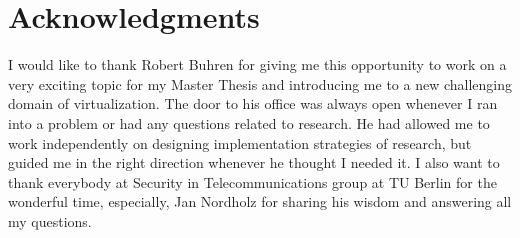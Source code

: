 \chapter*{Acknowledgments}

I would like to thank Robert Buhren for giving me this opportunity to work on a very exciting topic for my Master Thesis and introducing me to a new challenging domain of virtualization. The door to his office was always open whenever I ran into a problem or had any questions related to research. He had allowed me to work independently on designing implementation strategies of research, but guided me in the right direction whenever he thought I needed it. I also want to thank everybody at Security in Telecommunications group at TU Berlin for the wonderful time, especially, Jan Nordholz for sharing his wisdom and answering all my questions. 
